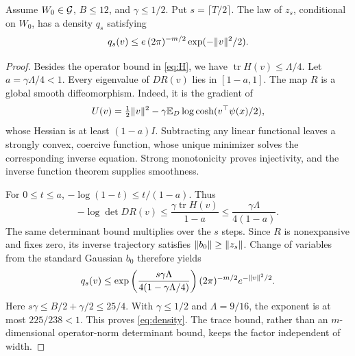 \documentclass[11pt,letterpaper,pmlr,twoside]{jmlr}
\begin{document}
\begin{lemma}
\label{lem:density}
Assume $W_0\in\mathcal G$, $B\le12$, and $\gamma\le1/2$. Put $s=\lceil T/2\rceil$. The law of $z_s$, conditional on $W_0$, has a density $q_s$ satisfying
\begin{equation}
 q_s(v)\le e\,(2\pi)^{-m/2}\exp(-\lVert v\rVert^2/2).
 \label{eq:density}
\end{equation}
\end{lemma}
\begin{proof}
Besides the operator bound in \eqref{eq:H}, we have $\operatorname{tr}H(v)\le\Lambda/4$. Let $a=\gamma\Lambda/4<1$. Every eigenvalue of $DR(v)$ lies in $[1-a,1]$. The map $R$ is a global smooth diffeomorphism. Indeed, it is the gradient of
\[
 U(v)=\tfrac12\lVert v\rVert^2-\gamma\mathbb E_D\log\cosh(v^\top\psi(x)/2),
\]
whose Hessian is at least $(1-a)I$. Subtracting any linear functional leaves a strongly convex, coercive function, whose unique minimizer solves the corresponding inverse equation. Strong monotonicity proves injectivity, and the inverse function theorem supplies smoothness.

For $0\le t\le a$, $-\log(1-t)\le t/(1-a)$. Thus
\[
 -\log\det DR(v)\le\frac{\gamma\operatorname{tr}H(v)}{1-a}
 \le\frac{\gamma\Lambda}{4(1-a)}.
\]
The same determinant bound multiplies over the $s$ steps. Since $R$ is nonexpansive and fixes zero, its inverse trajectory satisfies $\lVert b_0\rVert\ge\lVert z_s\rVert$. Change of variables from the standard Gaussian $b_0$ therefore yields
\[
 q_s(v)\le\exp\left(\frac{s\gamma\Lambda}{4(1-\gamma\Lambda/4)}\right)
            (2\pi)^{-m/2}e^{-\lVert v\rVert^2/2}.
\]
Here $s\gamma\le B/2+\gamma/2\le25/4$. With $\gamma\le1/2$ and $\Lambda=9/16$, the exponent is at most $225/238<1$. This proves \eqref{eq:density}. The trace bound, rather than an $m$-dimensional operator-norm determinant bound, keeps the factor independent of width.
\end{proof}
\end{document}

